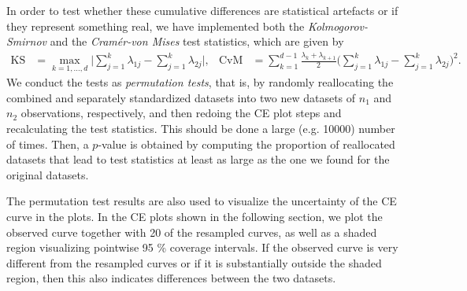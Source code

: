 \documentclass[titlepage,11pt,twoside]{article}
\begin{document}
In order to test whether these cumulative differences are statistical artefacts or if they represent something real, we have implemented both the \emph{Kolmogorov-Smirnov} and the \emph{Cram\'er-von Mises} test statistics, which are given by
\begin{align*}
\text{KS} &= \max_{k=1,\dotsc,d} \bigg\lvert \sum_{j=1}^k \lambda_{1j} - \sum_{j=1}^k \lambda_{2j} \bigg\rvert, &
\text{CvM} &= \sum_{k=1}^{d-1} \frac{\lambda_k + \lambda_{k+1}}{2} \bigg( \sum_{j=1}^k \lambda_{1j} - \sum_{j=1}^k \lambda_{2j} \bigg)^2.
\end{align*}
We conduct the tests as \textit{permutation tests}, that is, by randomly reallocating the combined and separately standardized datasets into two new datasets of $n_1$ and $n_2$ observations, respectively, and then redoing the CE plot steps and recalculating the test statistics. This should be done a large (e.g. 10000) number of times. Then, a $p$-value is obtained by computing the proportion of reallocated datasets that lead to %
test statistics at least as large as %
the one we found for the original datasets.

The permutation test results are also used to visualize the uncertainty of the CE curve in the plots. In the CE plots shown in the following section, we plot the observed curve together with 20 of the resampled curves, as well as a shaded region visualizing pointwise 95 \% coverage intervals. If the observed curve is very different from the resampled curves or if it is substantially outside the shaded region, then this also indicates differences between the two datasets.

\end{document}
